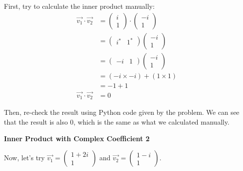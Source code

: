 \documentclass[a4paper, 10pt]{article}
\begin{document}
\begin{solution}
	First, try to calculate the inner product manually:
	\begin{align*}
		\vec{v_1} \cdot \vec{v_2} & = \begin{pmatrix} i \\ 1 \end{pmatrix} \cdot \begin{pmatrix} -i \\ 1 \end{pmatrix} \\
		                          & = \begin{pmatrix} i^* & 1^* \end{pmatrix} \begin{pmatrix} -i \\ 1 \end{pmatrix}    \\
		                          & = \begin{pmatrix} -i & 1 \end{pmatrix} \begin{pmatrix} -i \\ 1 \end{pmatrix}       \\
		                          & = (-i \times -i) + (1 \times 1)                                                    \\
		                          & = -1 + 1                                                                           \\
		\vec{v_1} \cdot \vec{v_2} & = 0
	\end{align*}

	Then, re-check the result using Python code given by the problem.
	We can see that the result is also 0, which is the same as what we calculated manually.
\end{solution}

\begin{problem}
\textbf{Inner Product with Complex Coefficient 2}
\par Now, let's try \( \vec{v_1} = \begin{pmatrix} 1 + 2i \\ 1 \end{pmatrix} \) and \( \vec{v_2} = \begin{pmatrix} 1 - i \\ 1 \end{pmatrix} \).
\end{problem}
\end{document}
